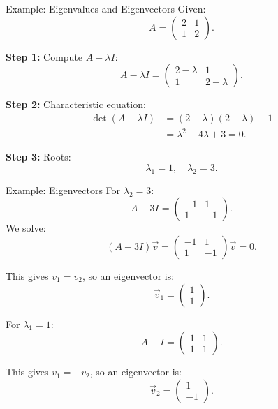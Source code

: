 \documentclass{beamer}
\begin{document}
	\begin{frame}{Example: Eigenvalues and Eigenvectors}
	Given:
		\begin{equation}
		A =
		\begin{pmatrix} 2 & 1 \\ 1 & 2 \end{pmatrix}.
		\end{equation}
	
	\textbf{Step 1:} Compute \(A - \lambda I\):
		\begin{equation}
		A - \lambda I =
		\begin{pmatrix} 2-\lambda & 1 \\ 1 & 2-\lambda \end{pmatrix}.
		\end{equation}
	
	\textbf{Step 2:} Characteristic equation:
		\begin{align}
		\det(A-\lambda I) &= (2-\lambda)(2-\lambda) -1 \\
		&= \lambda^2 -4\lambda+3 =0.
		\end{align}
	
	\textbf{Step 3:} Roots:
		\begin{equation}
		\lambda_1 = 1, \quad \lambda_2 = 3.
		\end{equation}
	\end{frame}

	\begin{frame}{Example: Eigenvectors}
	For \(\lambda_2=3\):
		\begin{equation}
		A-3I =
		\begin{pmatrix} -1 & 1 \\ 1 & -1 \end{pmatrix}.
		\end{equation}
	We solve:
		\begin{equation}
		(A-3I)\vec{v} =
		\begin{pmatrix} -1 & 1 \\ 1 & -1 \end{pmatrix}
		\vec{v} =
		0.
		\end{equation}
	
	This gives \(v_1=v_2\), so an eigenvector is:
		\begin{equation}
		\vec{v}_1 =
		\begin{pmatrix}1\\1\end{pmatrix}.
		\end{equation}
	
	For \(\lambda_1=1\):
		\begin{equation}
		A-I =
		\begin{pmatrix}1 &1 \\1 &1\end{pmatrix}.
		\end{equation}
	
	This gives \(v_1=-v_2\), so an eigenvector is:
		\begin{equation}
		\vec{v}_2 =
		\begin{pmatrix}1\\-1\end{pmatrix}.
		\end{equation}
	\end{frame}
\end{document}
